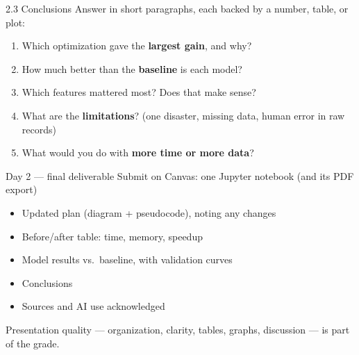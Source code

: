 \documentclass[aspectratio=43,11pt]{beamer}
\begin{document}
\begin{frame}{2.3 Conclusions}
  Answer in short paragraphs, each backed by a number, table, or plot:
  \vspace{0.5em}
  \begin{enumerate}
    \item Which optimization gave the \textbf{largest gain}, and why?
    \item How much better than the \textbf{baseline} is each model?
    \item Which features mattered most? Does that make sense?
    \item What are the \textbf{limitations}? (one disaster, missing data,
          human error in raw records)
    \item What would you do with \textbf{more time or more data}?
  \end{enumerate}
\end{frame}

\begin{frame}{Day 2 --- final deliverable}
  Submit on Canvas: one Jupyter notebook (and its PDF export)
  \vspace{0.5em}
  \begin{itemize}
    \item[$\square$] Updated plan (diagram + pseudocode), noting any changes
    \item[$\square$] Before/after table: time, memory, speedup
    \item[$\square$] Model results vs.\ baseline, with validation curves
    \item[$\square$] Conclusions
    \item[$\square$] Sources and AI use acknowledged
  \end{itemize}
  \vspace{0.8em}
  \small Presentation quality --- organization, clarity, tables, graphs,
  discussion --- is part of the grade.
\end{frame}
\end{document}

